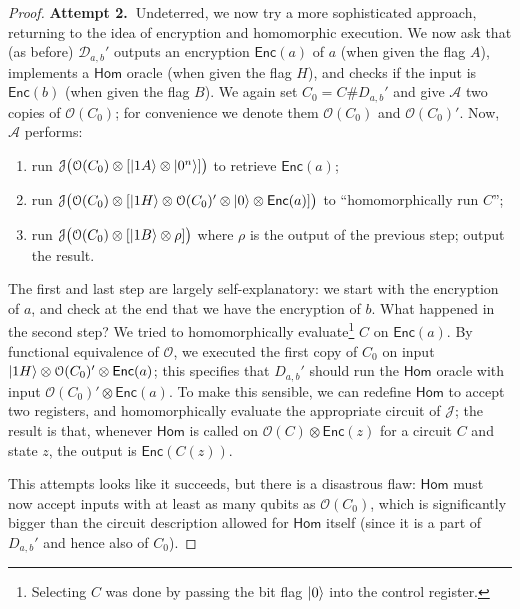 \documentclass[11pt]{article}
\numberwithin{equation}{section}
\newcommand{\algo}{\mathcal}
\newcommand{\Enc}{\ensuremath{\mathsf{Enc}}\xspace}
\newcommand{\Homorcl}{\ensuremath{\mathsf{Hom}}\xspace}
\begin{document}
{\begin{proof}
\textbf{Attempt 2.~}Undeterred, we now try a more sophisticated approach, returning to the idea of encryption and homomorphic execution. We now ask that (as before) $\mathcal D_{a, b}'$ outputs an encryption $\Enc(a)$ of $a$ (when given the flag $A$), implements a $\Homorcl$ oracle (when given the flag $H$), and checks if the input is $\Enc(b)$ (when given the flag $B$). We again set $C_0 = C \# D_{a, b}'$ and give $\algo A$ two copies of $\algo O(C_0)$; for convenience we denote them $\algo O(C_0)$ and $\algo O(C_0)'$. Now, $\algo A$ performs: 
\begin{enumerate}
\item run $\algo J \bigl( \algo O(C_0) \otimes [\ket{1A} \otimes \ket{0^n}]\bigr)$ to retrieve $\Enc(a)$;
\item run $\algo J \bigl( \algo O(C_0) \otimes [\ket{1H} \otimes \algo O(C_0)' \otimes \ket{0} \otimes \Enc(a)]\bigr)$ to ``homomorphically run $C$'';
\item run $\algo J \bigl( \algo O(C_0) \otimes [\ket{1B} \otimes \rho]\bigr)$ where $\rho$ is the output of the previous step; output the result.
\end{enumerate}
The first and last step are largely self-explanatory: we start with the encryption of $a$, and check at the end that we have the encryption of $b$. What happened in the second step? We tried to homomorphically evaluate\footnote{Selecting $C$ was done by passing the bit flag ${\left\vert{0}\right\rangle}$ into the control register.} $C$ on $\Enc(a)$. By functional equivalence of $\algo O$, we executed the first copy of $C_0$ on input $\ket{1H} \otimes \algo O(C_0)' \otimes \Enc(a)$; this specifies that $D_{a, b}'$ should run the $\Homorcl$ oracle with input $\mathcal O(C_0)' \otimes \Enc(a)$. To make this sensible, we can redefine $\Homorcl$ to accept two registers, and homomorphically evaluate the appropriate circuit of $\algo J$; the result is that, whenever $\Homorcl$ is called on $\mathcal O(C) \otimes \Enc(z)$ for a circuit $C$ and state $z$, the output is $\Enc(C(z))$.

This attempts looks like it succeeds, but there is a disastrous flaw: $\Homorcl$ must now accept inputs with at least as many qubits as $\algo O(C_0)$, which is significantly bigger than the circuit description allowed for $\Homorcl$ itself (since it is a part of $D_{a, b}'$ and hence also of $C_0$).


\end{proof}}
\end{document}
